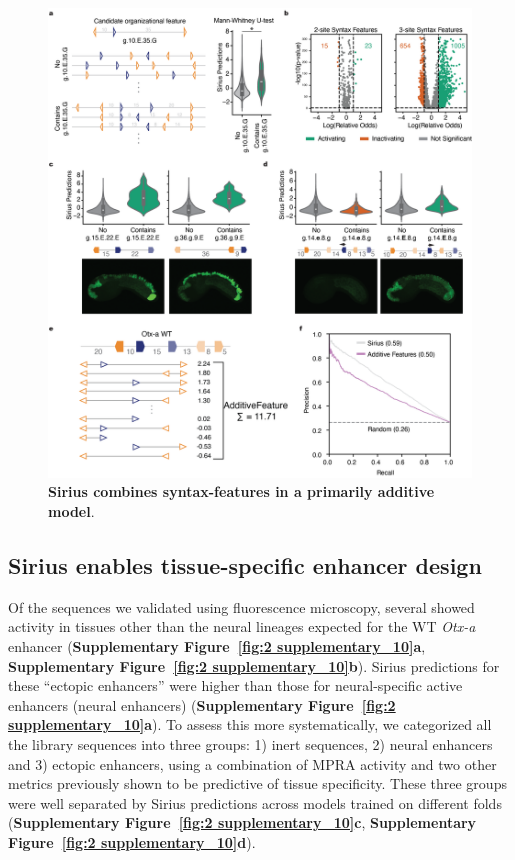 \clearpage

\begin{figure}[!htbp]
    \centering
    \includegraphics[height=0.75\textheight, keepaspectratio]{2_figures-and-files/Fig3.png}
    \caption[Sirius combines syntax-features in a primarily additive model.]{\textbf{Sirius combines syntax-features in a primarily additive model}.}
    \label{fig:2 Figure 3}
\end{figure}

\clearpage


\subsection{Sirius enables tissue-specific enhancer design}

Of the sequences we validated using fluorescence microscopy, several showed activity in tissues other than the neural lineages expected for the WT \textit{Otx-a} enhancer (\textbf{Supplementary Figure~\ref{fig:2 supplementary_10}a}, \textbf{Supplementary Figure~\ref{fig:2 supplementary_10}b}). Sirius predictions for these “ectopic enhancers” were higher than those for neural-specific active enhancers (neural enhancers) (\textbf{Supplementary Figure~\ref{fig:2 supplementary_10}a}). To assess this more systematically, we categorized all the library sequences into three groups: 1) inert sequences, 2) neural enhancers and 3) ectopic enhancers, using a combination of MPRA activity and two other metrics previously shown to be predictive of tissue specificity. These three groups were well separated by Sirius predictions across models trained on different folds (\textbf{Supplementary Figure~\ref{fig:2 supplementary_10}c}, \textbf{Supplementary Figure~\ref{fig:2 supplementary_10}d}).

